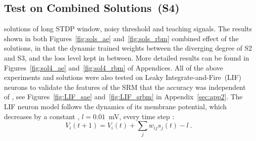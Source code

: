 \subsection{Test on Combined Solutions~(S4)}
\DIFdelbegin {}\DIFdelend \DIFaddbegin {}\DIFaddend solutions of long STDP window, noisy threshold and teaching signals.
The results shown in both Figures~\ref{fig:sols_ae} and~\ref{fig:sols_rbm} \DIFdelbegin {}\DIFdelend \DIFaddbegin {}\DIFaddend combined effect of the solutions, in that the dynamic trained weights \DIFdelbegin {}\DIFdelend \DIFaddbegin {}\DIFaddend between the diverging degree of S2 and S3, and the loss level \DIFdelbegin {}\DIFdelend \DIFaddbegin {}\DIFaddend kept in between.
More detailed \DIFdelbegin {}\DIFdelend \DIFaddbegin {}\DIFaddend results can be found in Figures~\ref{fig:sol4_ae} and~\ref{fig:sol4_rbm} of Appendices.
All of the above experiments and solutions were also tested on Leaky Integrate-and-Fire~(LIF) neurons to validate the features of the SRM that the accuracy was independent of \DIFdelbegin {}\DIFdelend \DIFaddbegin {}\DIFaddend , see Figures~\ref{fig:LIF_sae} and~\ref{fig:LIF_srbm} in Appendix~\ref{sec:app2}.
The LIF neuron model follows the dynamics of its membrane potential, which decreases by a constant \DIFaddbegin {}\DIFaddend , $l=0.01$~mV, every time step :
\begin{equation}
V_i(t+1)=V_i(t) + \sum_j w_{ij} s_j(t) - l~.
\end{equation}
